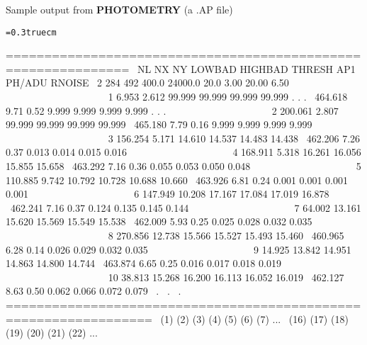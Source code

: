 \vfill
\eject
\centerline{Sample output from {\bf PHOTOMETRY} (a .AP file)}
\bigskip
{\noindent\obeylines\obeyspaces\frenchspacing\tt\baselineskip=0.3truecm

==============================================================
\ NL   NX   NY  LOWBAD HIGHBAD  THRESH     AP1  PH/ADU  RNOISE
\  2  284  492   400.0 24000.0    20.0    3.00   20.00    6.50
~~~~~~~~~~~~~~~~~~~
\     1    6.953    2.612   99.999   99.999   99.999   99.999 . . .
\      464.618  9.71  0.52   9.999    9.999    9.999    9.999 . . .
~~~~~~~~~~~~~~~~~~~
\     2  200.061    2.807   99.999   99.999   99.999   99.999
\      465.180  7.79  0.16   9.999    9.999    9.999    9.999
~~~~~~~~~~~~~~~~~~~
\     3  156.254    5.171   14.610   14.537   14.483   14.438
\      462.206  7.26  0.37   0.013    0.014    0.015    0.016
~~~~~~~~~~~~~~~~~~~
\     4  168.911    5.318   16.261   16.056   15.855   15.658
\      463.292  7.16  0.36   0.055    0.053    0.050    0.048
~~~~~~~~~~~~~~~~~~~
\     5  110.885    9.742   10.792   10.728   10.688   10.660
\      463.926  6.81  0.24   0.001    0.001    0.001    0.001
~~~~~~~~~~~~~~~~~~~
\     6  147.949   10.208   17.167   17.084   17.019   16.878
\      462.241  7.16  0.37   0.124    0.135    0.145    0.144
~~~~~~~~~~~~~~~~~~~
\     7   64.002   13.161   15.620   15.569   15.549   15.538
\      462.009  5.93  0.25   0.025    0.028    0.032    0.035
~~~~~~~~~~~~~~~~~~~
\     8  270.856   12.738   15.566   15.527   15.493   15.460
\      460.965  6.28  0.14   0.026    0.029    0.032    0.035
~~~~~~~~~~~~~~~~~~~
\     9   14.925   13.842   14.951   14.863   14.800   14.744
\      463.874  6.65  0.25   0.016    0.017    0.018    0.019
~~~~~~~~~~~~~~~~~~~
\    10   38.813   15.268   16.200   16.113   16.052   16.019
\      462.127  8.63  0.50   0.062    0.066    0.072    0.079
\                                   .
\                                   .
\                                   .
=================================================================
\    (1)    (2)      (3)      (4)      (5)      (6)      (7)  ...
\       (16)   (17)  (18)    (19)     (20)     (21)     (22) ...
}


